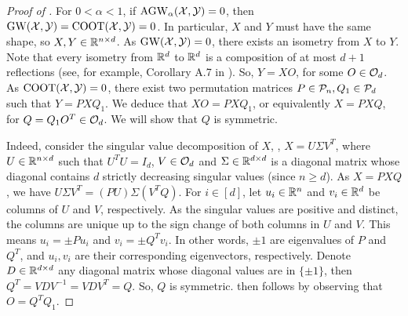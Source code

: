 \begin{proof}[Proof of ]
  For $0 < \alpha < 1$, if $\text{AGW}_{\alpha}(\mathcal X, \mathcal Y) = 0$, then
  $\text{GW}(\mathcal X, \mathcal Y) = \text{COOT}(\mathcal X, \mathcal Y) = 0$. In particular,
  $X$ and $Y$ must have the same shape, so $X, Y \in \mathbb R^{n \times d}$.
  As $\text{GW}(\mathcal X, \mathcal Y) = 0$, there exists an isometry from $X$ to $Y$. Note that every isometry from
  $\mathbb R^d$ to $\mathbb R^d$ is a composition of at most $d+1$ reflections
  (see, for example, Corollary A.7 in \citep{Konrad}). So, $Y = X O$, for some $O \in \mathcal O_d$.
  As $\text{COOT}(\mathcal X, \mathcal Y) = 0$, there exist two permutation matrices $P \in \mathcal P_n, Q_1 \in \mathcal P_d$ such that $Y = P X Q_1$.
  We deduce that $X O = P X Q_1$, or equivalently $X = P X Q$, for
  $Q = Q_1 O^T \in \mathcal O_d$. We will show that $Q$ is symmetric.

  Indeed, consider the singular value decomposition of $X$, \ie,
  $X = U \Sigma V^T$, where $U \in \mathbb R^{n \times d}$ such that $U^T U = I_d$,
  $V \in \mathcal O_d$ and $\Sigma \in \mathbb R^{d \times d}$ is a diagonal matrix
  whose diagonal contains $d$ strictly decreasing singular values (since $n \geq d$). As $X = P X Q$,
  we have $U \Sigma V^T = (PU) \Sigma (V^T Q)$. For $i \in [d]$, let $u_i \in \mathbb R^n$
  and $v_i \in \mathbb R^d$ be columns of $U$ and $V$, respectively.
  As the singular values are positive and distinct, the columns are unique up to
  the sign change of both columns in $U$ and $V$. This means $u_i = \pm Pu_i$ and
  $v_i = \pm Q^T v_i$. In other words, $\pm 1$ are eigenvalues of $P$ and $Q^T$, and
  $u_i, v_i$ are their corresponding eigenvectors, respectively. Denote $D \in \mathbb R^{d \times d}$
  any diagonal matrix whose diagonal values are in $\{ \pm 1 \}$, then
  $Q^T = V D V^{-1} = V D V^T = Q$. So, $Q$ is symmetric.
   then follows by observing that $O = Q^T Q_1$.
\end{proof}

